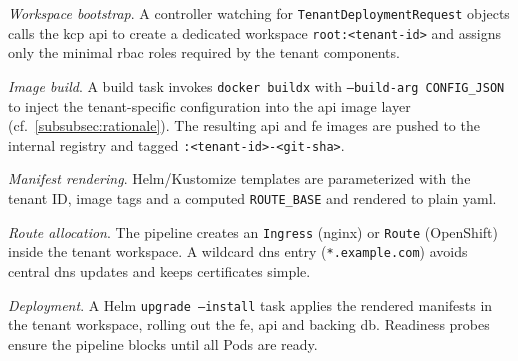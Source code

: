 \documentclass[11pt, a4paper, oneside, listof=totoc]{scrartcl}
\begin{document}
                \begin{enumerate}[label={[\arabic*]:},
                    ref=Challenge~\arabic*,
                    leftmargin=*,
                    itemsep=0.6\baselineskip]

                    \item\label{chal:bootstrap}
                        \textit{Workspace bootstrap}.  
                        A controller watching for \texttt{TenantDeploymentRequest} objects
                        calls the \gls{kcp} \gls{api} to create a dedicated workspace
                        \texttt{root:\textless{}tenant-id\textgreater{}} and assigns only the
                        minimal \gls{rbac} roles required by the tenant components.

                    \item\label{chal:imageBuild}
                        \textit{Image build}.
                        A build task invokes \texttt{docker buildx} with
                        \texttt{--build-arg CONFIG\_JSON} to inject the tenant-specific
                        configuration into the \gls{api} image layer
                        (cf.~\autoref{subsubsec:rationale}).  
                        The resulting \gls{api} and \gls{fe} images are pushed to the internal
                        registry and tagged
                        \texttt{:\textless{}tenant-id\textgreater{}-\textless{}git-sha\textgreater{}}.

                    \item\label{chal:manifestRendering}
                        \textit{Manifest rendering}.
                        Helm/Kustomize templates are parameterized with the tenant ID, image
                        tags and a computed \texttt{ROUTE\_BASE} and rendered to plain \gls{yaml}.

                    \item\label{chal:routeAllocation}
                        \textit{Route allocation}.
                        The pipeline creates an \texttt{Ingress} (nginx) or \texttt{Route}
                        (OpenShift) inside the tenant workspace.
                        A wildcard \gls{dns} entry (\texttt{*.example.com}) avoids central \gls{dns}
                        updates and keeps certificates simple.

                    \item\label{chal:applyManifests}
                        \textit{Deployment}.  
                        A Helm \texttt{upgrade --install} task applies the rendered manifests
                        in the tenant workspace, rolling out the \gls{fe}, \gls{api} and
                        backing \gls{db}.  
                        Readiness probes ensure the pipeline blocks until all Pods are ready.


\end{enumerate}
\end{document}
